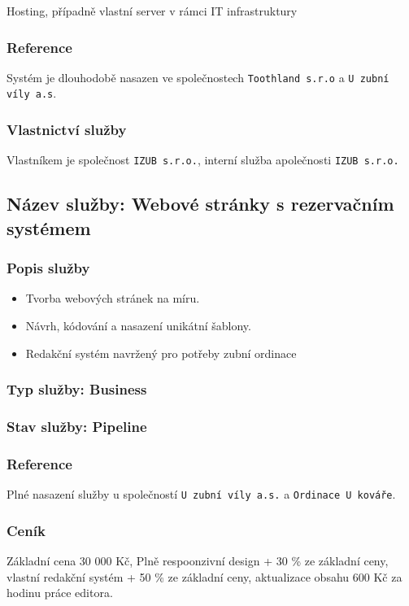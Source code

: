 \documentclass[11pt, a4paper, titlepage]{article}
\begin{document}
	Hosting, případně vlastní server v rámci IT infrastruktury

	\subsubsection*{Reference}
	Systém je dlouhodobě nasazen ve společnostech \texttt{Toothland s.r.o} a \texttt{U zubní víly a.s}.

	\subsubsection*{Vlastnictví služby}

	Vlastníkem je společnost \texttt{IZUB s.r.o.}, interní služba apolečnosti \texttt{IZUB s.r.o.}

	\subsection*{Název služby: Webové stránky s rezervačním systémem}

	\subsubsection*{Popis služby}
	\begin{itemize}
		\item Tvorba webových stránek na míru.
		\item Návrh, kódování a nasazení unikátní šablony.
		\item Redakční systém navržený pro potřeby zubní ordinace
	\end{itemize}

	\subsubsection*{Typ služby:  Business}

	\subsubsection*{Stav služby: Pipeline}

	\subsubsection*{Reference}
	Plné nasazení služby u společností \texttt{U zubní víly a.s.} a \texttt{Ordinace U kováře}.

	\subsubsection*{Ceník}
	Základní cena 30 000 Kč, Plně respoonzivní design + 30 \% ze základní ceny, vlastní redakční systém + 50 \% ze základní ceny, aktualizace obsahu 600 Kč za hodinu práce editora.
\end{document}
